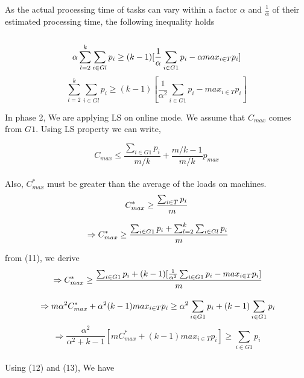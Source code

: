 \documentclass[10pt, conference, compsocconf]{IEEEtran}
\begin{document}
As the actual processing time of tasks  can vary within a factor $\alpha$ and $\frac{1}{\alpha}$ of their estimated processing time, the following inequality holds\\
\\
\begin{equation}{\nonumber}
 \alpha\sum_{l=2}^{k}\sum_{i \in Gl }^{}{{p_{i}}} \geq (k-1)[\frac{1}{\alpha}\sum_{i \in G1 }^{}{{p_{i}}}- \alpha {max_{i \in T}}{{p_{i}}}]
\end{equation}
\begin{equation}
\sum_{l=2}^{k}\sum_{i \in Gl }^{}{{p_{i}}} \geq (k-1)[\frac{1}{\alpha^{2}}\sum_{i \in G1 }^{}{{p_{i}}}-  {max_{i \in T}}{{p_{i}}}]
\end{equation}

In phase 2, We are applying LS on online mode. We assume that $C_{max}$ comes from $G1$. Using LS property we can write,

\begin{equation}
 C_{max} \leq \frac{\sum_{i \in G1 }^{}{{p_{i}}}}{m/k} + {\frac{m/k-1}{m/k}} p_{max} 
\end{equation}
\\

Also, $C_{max}^{*}$ must be greater than the average of the  loads on  machines.\\

\begin{equation}{\nonumber}
C_{max}^{*} \geq  \frac{\sum_{i \in T }^{}{{p_{i}}}}{m}
\end{equation}

\begin{equation}
{\nonumber}\Rightarrow C_{max}^{*} \geq  \frac{\sum_{i \in G1 }^{}{{p_{i}}}+ \sum_{l=2}^{k}\sum_{i \in Gl }^{}{{p_{i}}}}{m}
\end{equation}




from (11), we derive\\

\begin{equation}{\nonumber}
\Rightarrow C_{max}^{*} \geq  \frac{\sum_{i \in G1 }^{}{{p_{i}}}+ (k-1)[\frac{1}{\alpha^{2}}\sum_{i \in G1 }^{}{{p_{i}}}-  {max_{i \in T}}{{p_{i}}}]}{m}
\end{equation}

\begin{equation}{\nonumber}
\Rightarrow m\alpha^{2}C_{max}^{*} + \alpha^{2} (k-1){max_{i \in T}}{{p_{i}}} \geq  \alpha^{2}\sum_{i \in G1 }^{}{{p_{i}}}+ (k-1)\sum_{i \in G1 }^{}{{p_{i}}} 
\end{equation}
\begin{equation}
\Rightarrow\frac{\alpha^{2}}{\alpha^{2}+k-1}[m C_{max}^{*}+(k-1) {max_{i \in T}}{{p_{i}}}] \geq \sum_{i \in G1 }^{}{{p_{i}}}  
\end{equation}
\\
Using (12) and (13), We have
\end{document}
